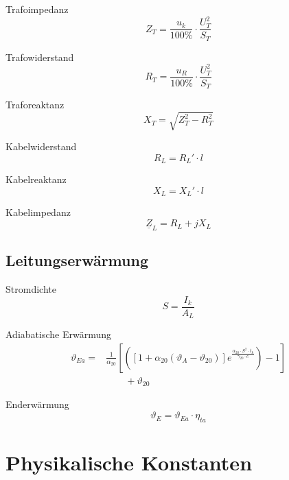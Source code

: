 \documentclass[11pt, a4paper, final, fleqn, twocolumn]{article}
\numberwithin{equation}{subsection}
\begin{document}
\noindent Trafoimpedanz
\begin{equation}
    Z_T = \frac{u_{k}}{100\%} \cdot \frac{U_{T}^2}{S_{T}}
\end{equation}

\noindent Trafowiderstand
\begin{equation}
    R_T = \frac{u_{R}}{100\%} \cdot \frac{U_{T}^2}{S_{T}}
\end{equation}

\noindent Traforeaktanz
\begin{equation}
    X_T = \sqrt{Z_T^2 - R_T^2}
\end{equation}

\noindent Kabelwiderstand
\begin{equation}
    R_L = R_L' \cdot l
\end{equation}

\noindent Kabelreaktanz
\begin{equation}
    X_L = X_L' \cdot l
\end{equation}

\noindent Kabelimpedanz
\begin{equation}
    \underline{Z}_L = R_L + jX_L
\end{equation}


\subsection{Leitungserwärmung}

Stromdichte
\begin{equation}
    S = \frac{I_k}{A_L}
\end{equation}

\noindent Adiabatische Erwärmung
\begin{equation}
\begin{split}
    \vartheta_{Ea} = & \frac{1}{\alpha_{20}}  \left[ \left( \left[ 1+\alpha_{20} (\vartheta_A - \vartheta_{20}) \right] e^{\frac{\alpha_{20} \cdot S^2 \cdot t_k}{\gamma_{20} \cdot c}} \right) -1 \right] \\
    & \qquad + \vartheta_{20}
\end{split}
\end{equation}

\noindent Enderwärmung
\begin{equation}
    \vartheta_E = \vartheta_{Ea} \cdot \eta_{ta}
\end{equation}



\section{Physikalische Konstanten}
\end{document}

